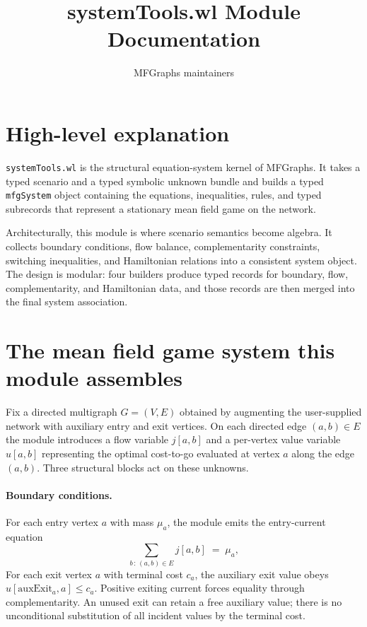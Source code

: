 \documentclass[11pt]{article}
\title{systemTools.wl Module Documentation}
\author{MFGraphs maintainers}
\date{}
\begin{document}
\maketitle

\section{High-level explanation}

\texttt{systemTools.wl} is the structural equation-system kernel of MFGraphs. It takes a typed scenario and a typed symbolic unknown bundle and builds a typed \texttt{mfgSystem} object containing the equations, inequalities, rules, and typed subrecords that represent a stationary mean field game on the network.

Architecturally, this module is where scenario semantics become algebra. It collects boundary conditions, flow balance, complementarity constraints, switching inequalities, and Hamiltonian relations into a consistent system object. The design is modular: four builders produce typed records for boundary, flow, complementarity, and Hamiltonian data, and those records are then merged into the final system association.

\section{The mean field game system this module assembles}

Fix a directed multigraph $G = (V, E)$ obtained by augmenting the user-supplied network with auxiliary entry and exit vertices. On each directed edge $(a, b) \in E$ the module introduces a flow variable $j[a, b]$ and a per-vertex value variable $u[a, b]$ representing the optimal cost-to-go evaluated at vertex $a$ along the edge $(a, b)$. Three structural blocks act on these unknowns.

\paragraph{Boundary conditions.} For each entry vertex $a$ with mass $\mu_a$, the module emits the entry-current equation
\[
\sum_{b\,:\,(a,b)\in E} j[a, b] \;=\; \mu_a,
\]
For each exit vertex $a$ with terminal cost $c_a$, the auxiliary exit value obeys
$u[\mathrm{auxExit}_a,a]\leq c_a$. Positive exiting current forces equality
through complementarity. An unused exit can retain a free auxiliary value;
there is no unconditional substitution of all incident values by the terminal cost.
\end{document}
